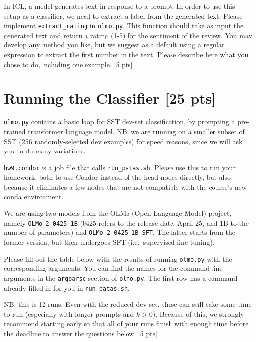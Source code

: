 \documentclass[11pt]{article}
\begin{document}
\vspace{2em}
 In ICL, a model generates text in response to a prompt.  In order to use this setup as a classifier, we need to extract a label from the generated text.  Please implement \texttt{extract\_rating} in \texttt{olmo.py}.  This function should take as input the generated text and return a rating (1-5) for the sentiment of the review.  You may develop any method you like, but we suggest as a default using a regular expression to extract the first number in the text.  Please describe here what you chose to do, including one example. \hfill [5 pts]


\section{Running the Classifier [25 pts]}

\texttt{olmo.py} contains a basic loop for SST dev-set classification, by prompting a pre-trained transformer language model.  NB: we are running on a smaller subset of SST (256 randomly-selected dev examples) for speed reasons, since we will ask you to do many variations.

\noindent \texttt{hw9.condor} is a job file that calls \texttt{run\_patas.sh}.  Please use this to run your homework, both to use Condor instead of the head-nodes directly, but also because it eliminates a few nodes that are not compatible with the course's new conda environment.

\noindent We are using two models from the OLMo (Open Language Model) project, namely \texttt{OLMo-2-0425-1B} (0425 refers to the release date, April 25, and 1B to the number of parameters) and \texttt{OLMo-2-0425-1B-SFT}.  The latter starts from the former version, but then undergoes SFT (i.e.\ supervised fine-tuning).

\vspace{2em}
  Please fill out the table below with the results of running \texttt{olmo.py} with the corresponding arguments.  You can find the names for the command-line arguments in the \texttt{argparse} section of \texttt{olmo.py}.  The first row has a command already filled in for you in \texttt{run\_patas.sh}.

\noindent NB: this is 12 runs.  Even with the reduced dev set, these can still take some time to run (especially with longer prompts and $k > 0$).  Because of this, we strongly recommend starting early so that all of your runs finish with enough time before the deadline to answer the questions below.  \hfill [5 pts]
\end{document}
